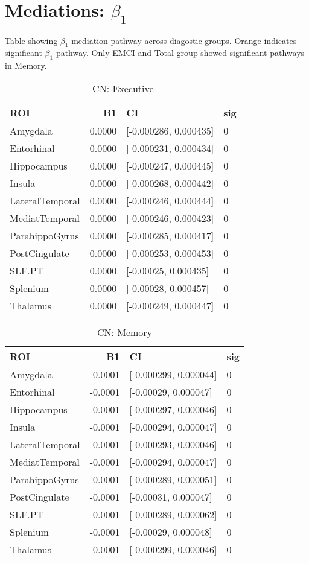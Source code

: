 \documentclass{article}
\begin{document}
\section*{Mediations: $\beta_1$}
Table showing $\beta_1$ mediation pathway across diagostic groups. Orange indicates significant $\beta_1$ pathway. Only EMCI and Total group showed significant pathways in Memory. 
\begin{table}[H]
\centering
\caption{CN: Executive} 
\begin{tabular}{lrll}
  \toprule
ROI & B1 & CI & sig \\ 
  \midrule
Amygdala & 0.0000 & [-0.000286, 0.000435] & 0 \\ 
  Entorhinal & 0.0000 & [-0.000231, 0.000434] & 0 \\ 
  Hippocampus & 0.0000 & [-0.000247, 0.000445] & 0 \\ 
  Insula & 0.0000 & [-0.000268, 0.000442] & 0 \\ 
  LateralTemporal & 0.0000 & [-0.000246, 0.000444] & 0 \\ 
  MediatTemporal & 0.0000 & [-0.000246, 0.000423] & 0 \\ 
  ParahippoGyrus & 0.0000 & [-0.000285, 0.000417] & 0 \\ 
  PostCingulate & 0.0000 & [-0.000253, 0.000453] & 0 \\ 
  SLF.PT & 0.0000 & [-0.00025, 0.000435] & 0 \\ 
  Splenium & 0.0000 & [-0.00028, 0.000457] & 0 \\ 
  Thalamus & 0.0000 & [-0.000249, 0.000447] & 0 \\ 
   \bottomrule
\end{tabular}
\end{table}%
\begin{table}[H]
\centering
\caption{CN: Memory} 
\begin{tabular}{lrll}
  \toprule
ROI & B1 & CI & sig \\ 
  \midrule
Amygdala & -0.0001 & [-0.000299, 0.000044] & 0 \\ 
  Entorhinal & -0.0001 & [-0.00029, 0.000047] & 0 \\ 
  Hippocampus & -0.0001 & [-0.000297, 0.000046] & 0 \\ 
  Insula & -0.0001 & [-0.000294, 0.000047] & 0 \\ 
  LateralTemporal & -0.0001 & [-0.000293, 0.000046] & 0 \\ 
  MediatTemporal & -0.0001 & [-0.000294, 0.000047] & 0 \\ 
  ParahippoGyrus & -0.0001 & [-0.000289, 0.000051] & 0 \\ 
  PostCingulate & -0.0001 & [-0.00031, 0.000047] & 0 \\ 
  SLF.PT & -0.0001 & [-0.000289, 0.000062] & 0 \\ 
  Splenium & -0.0001 & [-0.00029, 0.000048] & 0 \\ 
  Thalamus & -0.0001 & [-0.000299, 0.000046] & 0 \\ 
   \bottomrule
\end{tabular}
\end{table}
\end{document}
